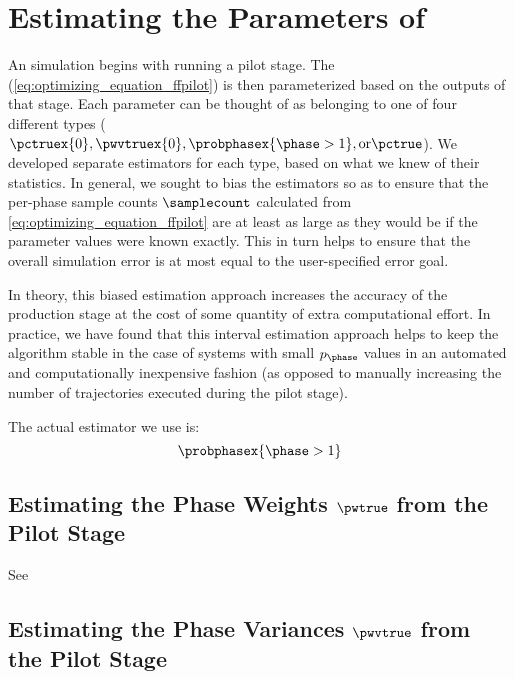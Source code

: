 %
%
%
%
        
\section{Estimating the Parameters of \opteq{}}
\label{sec:pilot_param_est}
An  simulation begins with running a pilot stage. The \opteq{}  (\eqref{eq:optimizing_equation_ffpilot}) is then parameterized based on the outputs of that stage. Each parameter can be thought of as belonging to one of four different types ($\pctruex{0}, \pwvtruex{0}, \probphasex{\phase > 1}, \textrm{or} \pctrue$). We developed separate estimators for each type, based on what we knew of their statistics. In general, we sought to bias the estimators so as to ensure that the per-phase sample counts $\samplecount$ calculated from \eqref{eq:optimizing_equation_ffpilot} are at least as large as they would be if the parameter values were known exactly. This in turn helps to ensure that the overall simulation error is at most equal to the user-specified error goal.

In theory, this biased estimation approach increases the accuracy of the production stage at the cost of some quantity of extra computational effort. In practice, we have found that this interval estimation approach helps to keep the  algorithm stable in the case of systems with small $p_\phase$ values in an automated and computationally inexpensive fashion (as opposed to manually increasing the number of trajectories executed during the pilot stage).

The actual estimator we use is:
    \begin{equation}
        \probphasex{\phase > 1}
    \end{equation}

\subsection{Estimating the Phase Weights $\pwtrue$ from the Pilot Stage}
\label{sec:pw_estimation}



See 


\subsection{Estimating the Phase Variances $\pwvtrue$ from the Pilot Stage}
\label{sec:pwv_estimation}


